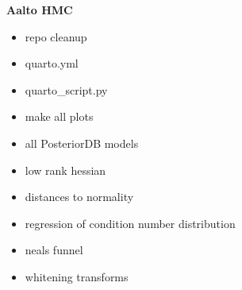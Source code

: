 \noindent \textbf{\Huge Aalto HMC}\\[0.3cm]

\begin{itemize}
\item repo cleanup 
\item quarto.yml
\item quarto_script.py
\item make all plots 
\item all PosteriorDB models 
\item low rank hessian 
\item distances to normality 
\item regression of condition number distribution
\item neals funnel
\item whitening transforms
\end{itemize}